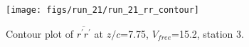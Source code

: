 \begin{figure}[H]
\centering
\texttt{[image: figs/run\_21/run\_21\_rr\_contour]}
\caption{Contour plot of $\overline{r^\prime r^\prime}$ at $z/c$=7.75, $V_{free}$=15.2, station 3.}
\label{fig:run_21_rr_contour}
\end{figure}


